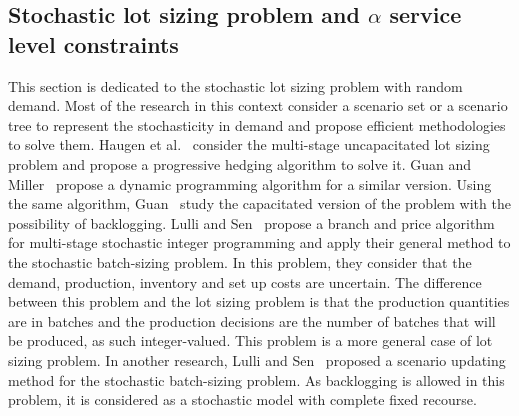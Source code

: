 \documentclass[10pt]{article}
\begin{document}
\subsection{Stochastic lot sizing problem and $\alpha$ service level constraints}
This section is dedicated to the stochastic lot sizing problem with random demand. Most of the research in this context consider a scenario set or a scenario tree to represent the stochasticity in demand and propose efficient methodologies to solve them. Haugen et al.~\cite{haugen2001progressive} consider the multi-stage uncapacitated lot sizing problem and propose a progressive hedging algorithm to solve it. Guan and Miller~\cite{guan2008polynomial} propose a dynamic programming algorithm for a similar version. Using the same algorithm, Guan~\cite{guan2011stochastic} study the capacitated version of the problem with the possibility of backlogging. Lulli and Sen~\cite{lulli2004branch} propose a branch and price algorithm for multi-stage stochastic integer programming and apply their general method to the stochastic batch-sizing problem. In this problem, they consider that the demand, production, inventory and set up costs are uncertain. The difference between this problem and the lot sizing problem is that the production quantities are in batches and the production decisions are the number of batches that will be produced, as such integer-valued. This problem is a more general case of lot sizing problem. In another research, Lulli and Sen~\cite{lulli2004branch}  proposed a scenario updating method for the stochastic batch-sizing problem. As backlogging is allowed in this problem, it is considered as a stochastic model with complete fixed recourse.  
\end{document}

